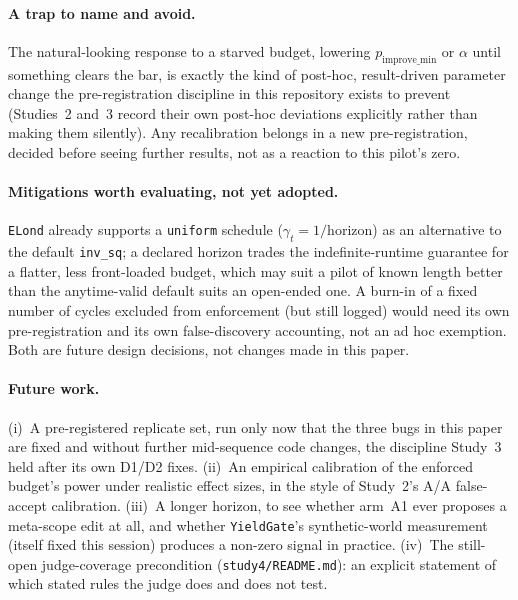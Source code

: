 \documentclass[11pt]{article}
\begin{document}
\paragraph{A trap to name and avoid.} The natural-looking response to a starved budget, lowering $p_\text{improve\_min}$ or $\alpha$ until something clears the bar, is exactly the kind of post-hoc, result-driven parameter change the pre-registration discipline in this repository exists to prevent (Studies~2 and~3 record their own post-hoc deviations explicitly rather than making them silently). Any recalibration belongs in a new pre-registration, decided before seeing further results, not as a reaction to this pilot's zero.

\paragraph{Mitigations worth evaluating, not yet adopted.} \texttt{ELond} already supports a \texttt{uniform} schedule ($\gamma_t = 1/\text{horizon}$) as an alternative to the default \texttt{inv\_sq}; a declared horizon trades the indefinite-runtime guarantee for a flatter, less front-loaded budget, which may suit a pilot of known length better than the anytime-valid default suits an open-ended one. A burn-in of a fixed number of cycles excluded from enforcement (but still logged) would need its own pre-registration and its own false-discovery accounting, not an ad hoc exemption. Both are future design decisions, not changes made in this paper.

\paragraph{Future work.} (i)~A pre-registered replicate set, run only now that the three bugs in this paper are fixed and without further mid-sequence code changes, the discipline Study~3 held after its own D1/D2 fixes. (ii)~An empirical calibration of the enforced budget's power under realistic effect sizes, in the style of Study~2's A/A false-accept calibration. (iii)~A longer horizon, to see whether arm~A1 ever proposes a meta-scope edit at all, and whether \texttt{YieldGate}'s synthetic-world measurement (itself fixed this session) produces a non-zero signal in practice. (iv)~The still-open judge-coverage precondition (\texttt{study4/README.md}): an explicit statement of which stated rules the judge does and does not test.
\end{document}
